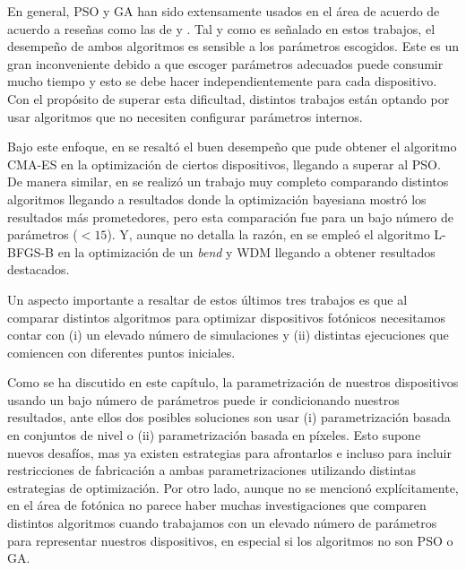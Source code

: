 En general, PSO y GA han sido extensamente usados en el área de acuerdo de acuerdo a reseñas como las de
\cite{Elsawy2020} y \cite{Campbell2019}. Tal y como es señalado en estos trabajos, el desempeño de ambos
algoritmos es sensible a los parámetros escogidos. Este es un gran inconveniente debido a que escoger
parámetros adecuados puede consumir mucho tiempo y esto se debe hacer independientemente para cada
dispositivo. Con el propósito de superar esta dificultad, distintos trabajos están optando por usar algoritmos
que no necesiten configurar parámetros internos.


Bajo este enfoque, en \cite{Gregory2015} se resaltó el buen desempeño que pude obtener el algoritmo CMA-ES en
la optimización de ciertos dispositivos, llegando a superar al PSO.
De manera similar, en \cite{Schneider2019} se realizó un trabajo muy completo comparando distintos algoritmos
llegando a resultados donde la optimización bayesiana mostró los resultados más prometedores,
pero esta comparación fue para un bajo número de parámetros ($< 15$).
Y, aunque no detalla la razón, en \cite{Su2020} se empleó el algoritmo 
L-BFGS-B en la optimización de un \emph{bend} y WDM llegando a obtener resultados destacados.

Un aspecto importante a resaltar de estos últimos tres trabajos es que al comparar distintos algoritmos para
optimizar dispositivos fotónicos necesitamos contar con
(i) un elevado número de simulaciones y
(ii) distintas ejecuciones que comiencen con diferentes puntos iniciales.

Como se ha discutido en este capítulo, la parametrización de nuestros dispositivos usando un bajo número
de parámetros puede ir condicionando nuestros resultados, ante ellos dos posibles soluciones son usar
(i) parametrización basada en conjuntos de nivel o (ii) parametrización basada en píxeles. 
Esto supone nuevos desafíos, mas ya existen estrategias para afrontarlos e
incluso para incluir restricciones de fabricación a ambas parametrizaciones
utilizando distintas estrategias de optimización.
Por otro lado, aunque no se mencionó explícitamente, en el área de fotónica no parece haber muchas
investigaciones que comparen distintos algoritmos cuando trabajamos con un 
elevado número de parámetros para representar nuestros dispositivos, 
en especial si los algoritmos no son PSO o GA.

